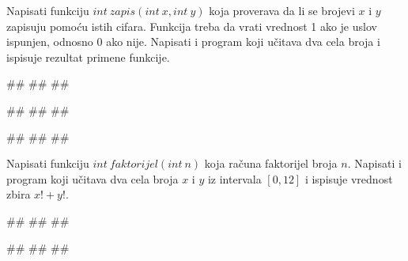 \begin{Exercise}[label=p1.4_]
\begin{comment}
\linkresenje{p1.4_11}
\end{Exercise}
\begin{Answer}[ref=p1.4_11]
\includecode{resenja/1_KontrolaToka/1.4_Funkcije/praktikumi9/4_11.c}
\end{Answer}
\end{comment}


\begin{Exercise}[label=p1.4_12] 
 Napisati funkciju $int\ zapis(int\ x, int\ y)$ koja proverava da li se brojevi $x$ i $y$ zapisuju pomoću istih cifara. Funkcija treba da vrati vrednost 1 ako je uslov ispunjen, odnosno 0 ako nije. Napisati i program koji učitava dva cela broja i ispisuje rezultat primene funkcije. 
 
\begin{miditest}
\begin{upotreba}{1}
#\naslovInt#
##
##
\end{upotreba}
\end{miditest}
\begin{miditest}
\begin{upotreba}{2}
#\naslovInt#
##
##
\end{upotreba}
\end{miditest}

\begin{miditest}
\begin{upotreba}{3}
#\naslovInt#
##
##
\end{upotreba}
\end{miditest} 

\end{Exercise}
\begin{Answer}[ref=p1.4_12]
\end{Answer}

\begin{Exercise}[label=p1.4_13] 
 Napisati funkciju $int\ faktorijel(int\ n)$ koja računa faktorijel broja $n$. Napisati i program koji učitava dva cela broja $x$ i $y$ iz intervala $[0,12]$ i ispisuje vrednost zbira $x!+y!$. 
 
\begin{miditest}
\begin{upotreba}{1}
#\naslovInt#
##
##
\end{upotreba}
\end{miditest}
\begin{miditest}
\begin{upotreba}{2}
#\naslovInt#
##
##
\end{upotreba}
\end{miditest}


\end{Exercise}
\end{Exercise}
